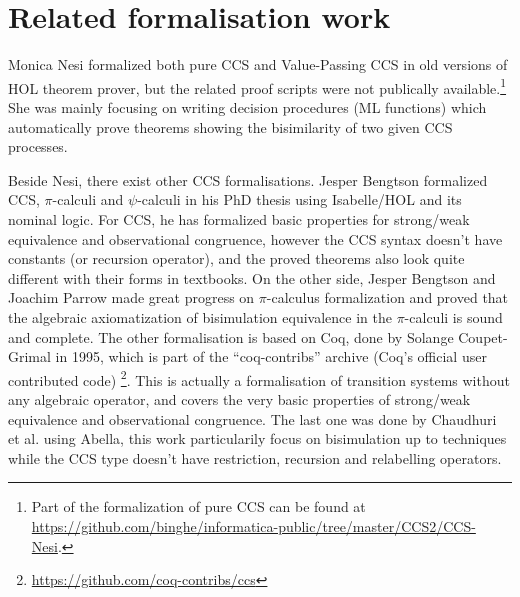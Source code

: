 \section{Related formalisation work}

Monica Nesi formalized both pure CCS \cite{Nesi:1992ve} and Value-Passing CCS
\cite{Nesi:2017wo} in old versions of HOL theorem prover, but the
related proof scripts were not publically available.\footnote{Part of
 the formalization of pure CCS can be found at \url{https://github.com/binghe/informatica-public/tree/master/CCS2/CCS-Nesi}.}
She was mainly focusing on writing decision procedures (ML functions) which
automatically prove theorems showing the bisimilarity of two given CCS
processes.%

Beside Nesi, there exist other CCS formalisations. Jesper Bengtson
formalized CCS, $\pi$-calculi and $\psi$-calculi in his PhD
thesis \cite{bengtson2010formalising} using Isabelle/HOL and its
nominal logic. For CCS, he has formalized
basic properties for strong/weak equivalence and observational
congruence, however the CCS syntax doesn't have constants
(or recursion operator), and the proved theorems also look quite
different with their forms in textbooks.
On the other side, Jesper
Bengtson and Joachim Parrow made great progress on $\pi$-calculus formalization and
proved that the algebraic axiomatization of bisimulation
equivalence in the $\pi$-calculi is sound and complete. \cite{bengtson2007completeness}
The other formalisation is based on Coq, done by Solange
Coupet-Grimal in 1995, which is part of the
``coq-contribs'' archive (Coq's official user contributed code)
\footnote{\url{https://github.com/coq-contribs/ccs}}. This is actually
a formalisation of transition systems without any algebraic operator,
and covers the very basic properties of strong/weak equivalence and observational
congruence. The last one was done by Chaudhuri et
al. \cite{chaudhuri2014formalization} using Abella, this work
particularily focus on bisimulation up to techniques while the CCS
type doesn't have restriction, recursion and relabelling operators.
